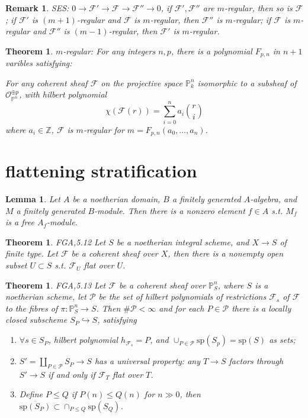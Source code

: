 \documentclass{article}
\newtheorem{lem}[defn]{Lemma}
\newtheorem{thm}[defn]{Theorem}
\newtheorem{rmk}[defn]{Remark}
\begin{document}
\begin{rmk}
	SES: $ 0\to\mathcal{F}'\to \mathcal{F}\to \mathcal{F}''\to 0 $, if $ \mathcal{F}',\mathcal{F}'' $ are $ m $-regular, then so is $ \mathcal{F} $; if $ \mathcal{F}' $ is $ (m+1) $-regular and $ \mathcal{F} $ is $ m $-regular, then $ \mathcal{F}'' $ is $ m $-regular; if $ \mathcal{F} $ is $ m $-regular and $ \mathcal{F}'' $ is $ (m-1) $-regular, then $ \mathcal{F}' $ is $ m $-regular.
\end{rmk}

\begin{thm}\label{m-regular poly}
	\emph{$ m $-regular}: For any integers $ n,p $, there is a polynomial $ F_{p,n} $ in $ n+1 $ varibles satisfying:
	
	For any coherent sheaf $ \mathcal{F} $ on the projective space $ \mathbb{P}^n_k $  isomorphic to a subsheaf of $ \mathcal{O}_{\mathbb{P}^n}^{\oplus p} $, with hilbert polynomial
	$$ \chi (\mathcal{F}(r))=\sum_{i=0}^{n}a_i\binom{r}{i} $$
	where $ a_i\in \mathbb{Z} $, $ \mathcal{F} $ is $ m $-regular for $ m=F_{p,n}(a_0,\ldots,a_n) $. 
\end{thm}

\section{flattening stratification}

\begin{lem}
	Let $ A $ be a noetherian domain, $ B $ a finitely generated $ A $-algebra, and $ M $ a finitely generated $ B $-module. Then there is a nonzero element $ f\in A $ s.t. $ M_f $ is a free $ A_f $-module. 
\end{lem}

\begin{thm}
	\emph{FGA,5.12} Let $ S $ be a noetherian integral scheme, and $ X\to S $ of finite type. Let $ \mathcal{F} $ be a coherent sheaf over $ X $, then there is a nonempty open subset $ U\subset S $ s.t. $ \mathcal{F}_U $ flat over $ U $.
\end{thm}

\begin{thm}
	\emph{FGA,5.13} Let $ \mathcal{F} $ be a coherent sheaf over $ \mathbb{P}^n_S $, where $ S $ is a noetherian scheme, let $ \mathcal{P} $ be the set of hilbert polynomials of restrictions  $ \mathcal{F}_s $ of $ \mathcal{F} $ to the fibres of $ \pi:\mathbb{P}^n_S\to S $. Then $ \#\mathcal{P}<\infty $ and for each $ P\in\mathcal{P} $ there is a locally closed subscheme $ S_P\hookrightarrow S $, satisfying
	\begin{enumerate}
		\item $ \forall s\in S_P$, hilbert polynomial $ h_{\mathcal{F}_s}=P $, and $ \cup_{P\in \mathcal{P}} \mathrm{sp}(S_p)=\mathrm{sp}(S) $ as sets;
		\item  $ S'=\coprod_{P\in\mathcal{P}}S_P\to S $ has a universal property: any $ T\to S $ factors through $ S'\to S $ if and only if $ \mathcal{F}_T $ flat over $ T $.
		\item Define $ P\leqslant Q $ if $ P(n)\leqslant Q(n) $ for $ n\gg0 $, then $ \overline{\mathrm{sp}(S_P)}\subset \cap_{P\leqslant Q}\mathrm{sp}(S_Q) $.
	\end{enumerate}
\end{thm}
\end{document}

